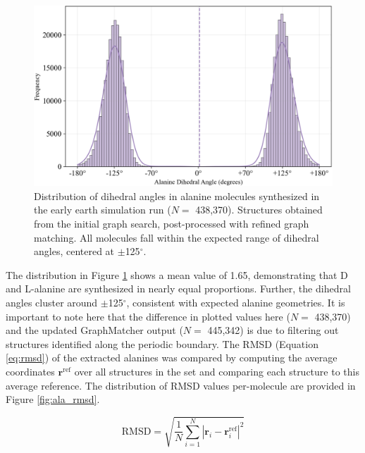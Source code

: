 \begin{figure}[!ht]
    \centering
    \includegraphics[width=1\linewidth]{Images/alanine_dihedral/alanine_dihedrals_updated.png}
    \caption[Distribution of synthesized alanine dihedral angles]{Distribution of dihedral angles in alanine molecules synthesized in the early earth simulation run ($N=$ 438,370). Structures obtained from the initial graph search, post-processed with refined graph matching. All molecules fall within the expected range of dihedral angles, centered at $\pm$125$^\circ$.}
    \label{fig:ala_dihedral}
\end{figure}

The distribution in Figure \ref{fig:ala_dihedral} shows a mean value of 1.65\textdegree, demonstrating that D and L-alanine are synthesized in nearly equal proportions. 
Further, the dihedral angles cluster around $\pm$125$^\circ$, consistent with expected alanine geometries.
It is important to note here that the difference in plotted values  here ($N=$ 438,370) and the updated GraphMatcher output ($N=$ 445,342) is due to filtering out structures identified along the periodic boundary. 
The RMSD (Equation \ref{eq:rmsd}) of the extracted alanines was compared by computing the average coordinates $\mathbf{r}^{\text{ref}}$ over all structures in the set and comparing each structure to this average reference.
The distribution of RMSD values per-molecule are provided in Figure \ref{fig:ala_rmsd}. 

\begin{equation}
\label{eq:rmsd}
    \text{RMSD} = \sqrt{\frac{1}{N} \sum_{i=1}^{N} \left| \mathbf{r}_i - \mathbf{r}_i^{\text{ref}} \right|^2 }
\end{equation}


